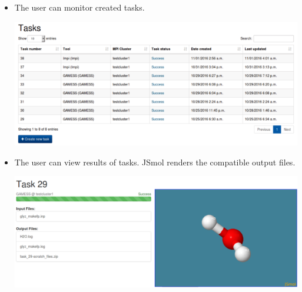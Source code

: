 \documentclass[journal]{./IEEE/IEEEtran}
\begin{document}
\begin{itemize}
		\item The user can monitor created tasks. \newline
		\begin{center}			
			\includegraphics[scale=0.40]{./images/tasks_list_view_2.png}			
		\end{center}	
		\item The user can view results of tasks. JSmol renders the compatible output files\cite{IJCH:IJCH201300024}. \newline
		\begin{center}			
			\includegraphics[scale=0.35]{./images/jsmol_detail_view_2.png}			
		\end{center}	

		    
		
	\end{itemize}
	
\end{document}
